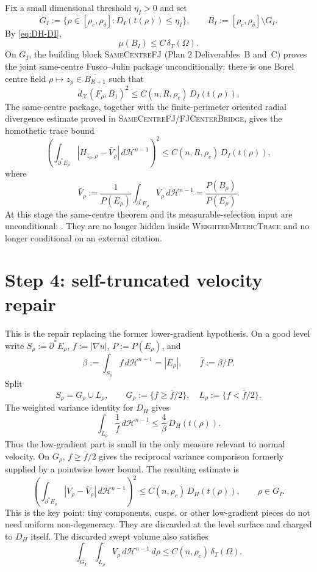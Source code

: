 \documentclass[11pt]{article}
\theoremstyle{definition}
\newcommand{\Om}{\Omega}
\newcommand{\X}{\mathcal X}
\newcommand{\rdel}{\rho_\delta}
\begin{document}
Fix a small dimensional threshold $\eta_I>0$ and set
\[
  G_I:=\{\rho\in[\rho_c,\rdel]:D_I(t(\rho))\le\eta_I\},
  \qquad B_I:=[\rho_c,\rdel]\setminus G_I .
\]
By \eqref{eq:DH-DI},
\begin{equation}\label{eq:BI}
  \mu(B_I)\le C\,\delta_T(\Om).
\end{equation}
On $G_I$, the building block \textsc{SameCentreFJ} (Plan 2
Deliverables~B and~C) proves the joint same-centre Fusco--Julin
package unconditionally: there is one Borel centre field
$\rho\mapsto z_\rho\in\overline{B_{R+1}}$ such that
\begin{equation}\label{eq:FJ-distance}
  d_\X(F_\rho,B_1)^2\le C(n,R,\rho_c)\,D_I(t(\rho)).
\end{equation}
The same-centre package, together with the finite-perimeter oriented
radial divergence estimate proved in
\textsc{SameCentreFJ}/\textsc{FJCenterBridge}, gives the homothetic
trace bound
\begin{equation}\label{eq:H-trace}
  \left(
    \int_{\partial^*E_\rho}|H_{z_\rho,\rho}-\bar V_\rho|\,
    d\mathcal H^{n-1}
  \right)^2
  \le C(n,R,\rho_c)\,D_I(t(\rho)),
\end{equation}
where
\[
  \bar V_\rho:=\frac1{P(E_\rho)}
  \int_{\partial^*E_\rho}V_\rho\,d\mathcal H^{n-1}
  =\frac{P(B_\rho)}{P(E_\rho)} .
\]
At this stage the same-centre theorem and its measurable-selection
input are unconditional: \cite[Thm.~3.6 + Prop.~4.2]{SameCentreFJ}.
They are no longer hidden inside \textsc{WeightedMetricTrace} and no
longer conditional on an external citation.

\section{Step 4: self-truncated velocity repair}

This is the repair replacing the former lower-gradient hypothesis.
On a good level write $S_\rho:=\partial^*E_\rho$,
$f:=|\nabla u|$, $P:=P(E_\rho)$, and
\[
  \beta:=\int_{S_\rho} f\,d\mathcal H^{n-1}=|E_\rho|,
  \qquad \bar f:=\beta/P.
\]
Split
\[
  S_\rho=G_\rho\cup L_\rho,\qquad
  G_\rho:=\{f\ge\bar f/2\},\quad L_\rho:=\{f<\bar f/2\}.
\]
The weighted variance identity for $D_H$ gives
\begin{equation}\label{eq:low-charge}
  \int_{L_\rho}\frac1f\,d\mathcal H^{n-1}
  \le \frac{4}{\beta}\,D_H(t(\rho)).
\end{equation}
Thus the low-gradient part is small in the only measure relevant to
normal velocity.  On $G_\rho$, $f\ge\bar f/2$ gives the reciprocal
variance comparison formerly supplied by a pointwise lower bound.
The resulting estimate is
\begin{equation}\label{eq:trimmed-V}
  \left(
    \int_{\partial^*E_\rho}|V_\rho-\bar V_\rho|\,d\mathcal H^{n-1}
  \right)^2
  \le C(n,\rho_c)\,D_H(t(\rho)),
  \qquad \rho\in G_I.
\end{equation}
This is the key point: tiny components, cusps, or other low-gradient
pieces do not need uniform non-degeneracy.  They are discarded at the
level surface and charged to $D_H$ itself.  The discarded swept volume
also satisfies
\[
  \int_{G_I}\int_{L_\rho}V_\rho\,d\mathcal H^{n-1}\,d\rho
  \le C(n,\rho_c)\,\delta_T(\Om).
\]
\end{document}

